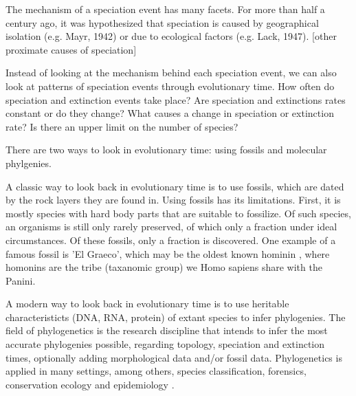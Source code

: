 The mechanism of a speciation event has many facets.
For more than half a century ago, it was hypothesized
that speciation is caused by geographical isolation (e.g. Mayr, 1942)
or due to ecological factors (e.g. Lack, 1947). [other proximate 
causes of speciation]

%

Instead of looking at the mechanism behind each speciation event,
we can also look at patterns of speciation events through evolutionary time.
How often do speciation and extinction events take place?
Are speciation and extinctions rates constant or do they change?
What causes a change in speciation or extinction rate?
Is there an upper limit on the number of species?

There are two ways to look in evolutionary time:
using fossils and molecular phylgenies.


A classic way to look back in evolutionary time is to use fossils,
which are dated by the rock layers they are found in.
Using fossils has its limitations. First, it is mostly species with hard body
parts that are suitable to fossilize. Of such species, an organisms is still 
only rarely preserved, of which only a fraction under ideal circumstances. Of 
these fossils, only a fraction is discovered.
One example of a famous fossil is 'El Graeco', 
which may be the oldest known hominin \cite{fuss2017potential}, where
homonins are the tribe (taxanomic group) we Homo sapiens share with the Panini.


A modern way to look back in evolutionary time is to use
heritable characteristicts (DNA, RNA, protein) 
of extant species to infer phylogenies. 
The field of phylogenetics is the research discipline that
intends to infer the most accurate phylogenies possible, 
regarding topology, speciation and extinction times,
optionally adding morphological data and/or fossil data.
Phylogenetics is applied in many settings, among
others, species classification,
forensics, conservation ecology
and epidemiology \cite{lam2010use}.

